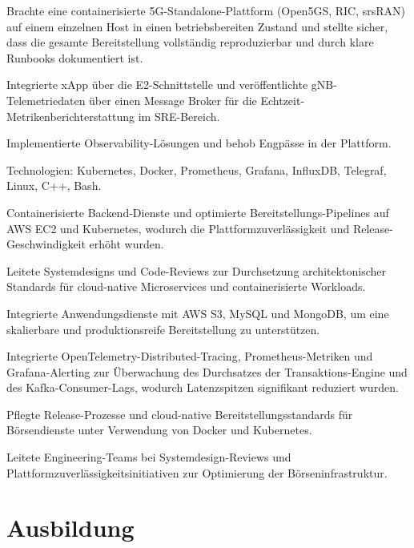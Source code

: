 \documentclass[10pt,a4paper]{resume}
\begin{document}
\bullets
  \item Brachte eine containerisierte 5G-Standalone-Plattform (Open5GS, RIC, srsRAN) auf einem einzelnen Host in einen betriebsbereiten Zustand und stellte sicher, dass die gesamte Bereitstellung vollständig reproduzierbar und durch klare Runbooks dokumentiert ist.
  \item Integrierte xApp über die E2-Schnittstelle und veröffentlichte gNB-Telemetriedaten über einen Message Broker für die Echtzeit-Metrikenberichterstattung im SRE-Bereich.
  \item Implementierte Observability-Lösungen und behob Engpässe in der Plattform.
  \item Technologien: Kubernetes, Docker, Prometheus, Grafana, InfluxDB, Telegraf, Linux, C++, Bash.
\bulletsend
\vspace{1.5pt}
\bullets
  \item Containerisierte Backend-Dienste und optimierte Bereitstellungs-Pipelines auf AWS EC2 und Kubernetes, wodurch die Plattformzuverlässigkeit und Release-Geschwindigkeit erhöht wurden.
  \item Leitete Systemdesigns und Code-Reviews zur Durchsetzung architektonischer Standards für cloud-native Microservices und containerisierte Workloads.
  \item Integrierte Anwendungsdienste mit AWS S3, MySQL und MongoDB, um eine skalierbare und produktionsreife Bereitstellung zu unterstützen.
\bulletsend
\vspace{1.5pt}
\bullets
  \item Integrierte OpenTelemetry-Distributed-Tracing, Prometheus-Metriken und Grafana-Alerting zur Überwachung des Durchsatzes der Transaktions-Engine und des Kafka-Consumer-Lags, wodurch Latenzspitzen signifikant reduziert wurden.
  \item Pflegte Release-Prozesse und cloud-native Bereitstellungsstandards für Börsendienste unter Verwendung von Docker und Kubernetes.
  \item Leitete Engineering-Teams bei Systemdesign-Reviews und Plattformzuverlässigkeitsinitiativen zur Optimierung der Börseninfrastruktur.
\bulletsend
\vspace{1.5pt}

\section{Ausbildung}
\end{document}
